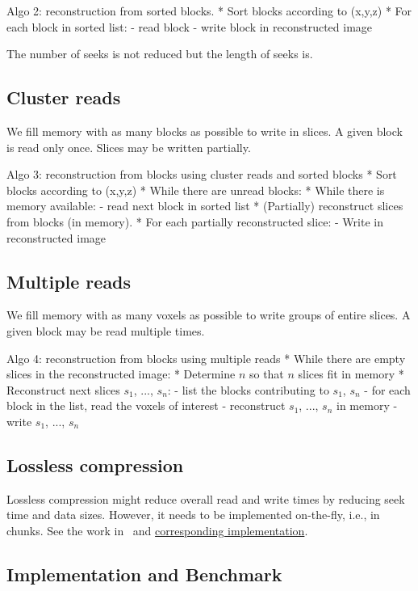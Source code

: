 \documentclass[10pt, conference, compsocconf]{IEEEtran}
\begin{document}
Algo 2: reconstruction from sorted blocks.
* Sort blocks according to (x,y,z)
* For each block in sorted list:
  - read block
  - write block in reconstructed image

The number of seeks is not reduced but the length of seeks is.

\subsection{Cluster reads}

We fill memory with as many blocks as possible to write in slices. A
given block is read only once. Slices may be written partially.

Algo 3: reconstruction from blocks using cluster reads and sorted blocks
* Sort blocks according to (x,y,z)
* While there are unread blocks:
  * While there is memory available:
    - read next block in sorted list
  * (Partially) reconstruct slices from blocks (in memory).
  * For each partially reconstructed slice:
    - Write in reconstructed image

\subsection{Multiple reads}

We fill memory with as many voxels as possible to write groups of
entire slices. A given block may be read multiple times.

Algo 4: reconstruction from blocks using multiple reads
* While there are empty slices in the reconstructed image:
  * Determine $n$ so that $n$ slices fit in memory
  * Reconstruct next slices $s_1$, ...,  $s_n$:
     - list the blocks contributing to $s_1$, $s_n$
     - for each block in the list, read the voxels of interest
     - reconstruct $s_1$, ..., $s_n$ in memory
     - write $s_1$, ..., $s_n$

\subsection{Lossless compression}
     
Lossless compression might reduce overall read and write times by
reducing seek time and data sizes. However, it needs to be implemented
on-the-fly, i.e., in chunks. See the work in~\cite{rajna2015speeding}
and \href{https://github.com/pauldmccarthy/indexed\_gzip}{corresponding
  implementation}.
     
\subsection{Implementation and Benchmark}
\end{document}
